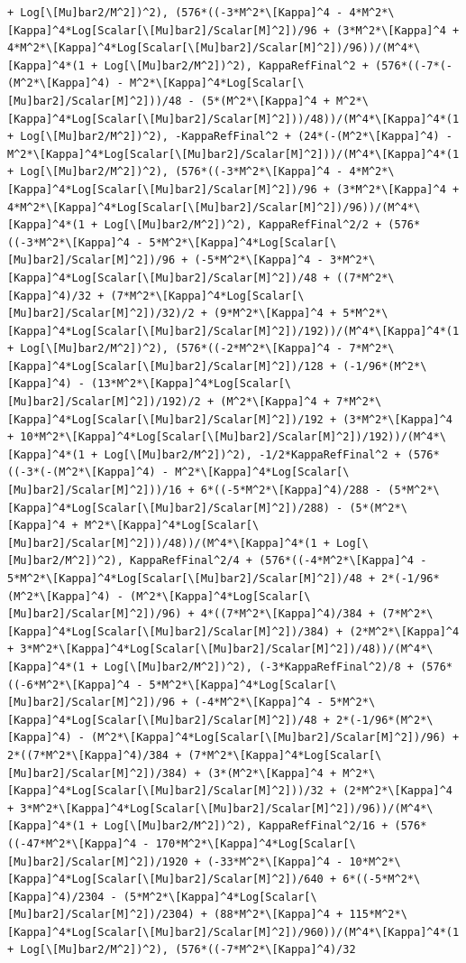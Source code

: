 \documentclass[11pt]{article}
\begin{document}
\begin{verbatim}
+ Log[\[Mu]bar2/M^2])^2), (576*((-3*M^2*\[Kappa]^4 - 4*M^2*\[Kappa]^4*Log[Scalar[\[Mu]bar2]/Scalar[M]^2])/96 + (3*M^2*\[Kappa]^4 + 4*M^2*\[Kappa]^4*Log[Scalar[\[Mu]bar2]/Scalar[M]^2])/96))/(M^4*\[Kappa]^4*(1 + Log[\[Mu]bar2/M^2])^2), KappaRefFinal^2 + (576*((-7*(-(M^2*\[Kappa]^4) - M^2*\[Kappa]^4*Log[Scalar[\[Mu]bar2]/Scalar[M]^2]))/48 - (5*(M^2*\[Kappa]^4 + M^2*\[Kappa]^4*Log[Scalar[\[Mu]bar2]/Scalar[M]^2]))/48))/(M^4*\[Kappa]^4*(1 + Log[\[Mu]bar2/M^2])^2), -KappaRefFinal^2 + (24*(-(M^2*\[Kappa]^4) - M^2*\[Kappa]^4*Log[Scalar[\[Mu]bar2]/Scalar[M]^2]))/(M^4*\[Kappa]^4*(1 + Log[\[Mu]bar2/M^2])^2), (576*((-3*M^2*\[Kappa]^4 - 4*M^2*\[Kappa]^4*Log[Scalar[\[Mu]bar2]/Scalar[M]^2])/96 + (3*M^2*\[Kappa]^4 + 4*M^2*\[Kappa]^4*Log[Scalar[\[Mu]bar2]/Scalar[M]^2])/96))/(M^4*\[Kappa]^4*(1 + Log[\[Mu]bar2/M^2])^2), KappaRefFinal^2/2 + (576*((-3*M^2*\[Kappa]^4 - 5*M^2*\[Kappa]^4*Log[Scalar[\[Mu]bar2]/Scalar[M]^2])/96 + (-5*M^2*\[Kappa]^4 - 3*M^2*\[Kappa]^4*Log[Scalar[\[Mu]bar2]/Scalar[M]^2])/48 + ((7*M^2*\[Kappa]^4)/32 + (7*M^2*\[Kappa]^4*Log[Scalar[\[Mu]bar2]/Scalar[M]^2])/32)/2 + (9*M^2*\[Kappa]^4 + 5*M^2*\[Kappa]^4*Log[Scalar[\[Mu]bar2]/Scalar[M]^2])/192))/(M^4*\[Kappa]^4*(1 + Log[\[Mu]bar2/M^2])^2), (576*((-2*M^2*\[Kappa]^4 - 7*M^2*\[Kappa]^4*Log[Scalar[\[Mu]bar2]/Scalar[M]^2])/128 + (-1/96*(M^2*\[Kappa]^4) - (13*M^2*\[Kappa]^4*Log[Scalar[\[Mu]bar2]/Scalar[M]^2])/192)/2 + (M^2*\[Kappa]^4 + 7*M^2*\[Kappa]^4*Log[Scalar[\[Mu]bar2]/Scalar[M]^2])/192 + (3*M^2*\[Kappa]^4 + 10*M^2*\[Kappa]^4*Log[Scalar[\[Mu]bar2]/Scalar[M]^2])/192))/(M^4*\[Kappa]^4*(1 + Log[\[Mu]bar2/M^2])^2), -1/2*KappaRefFinal^2 + (576*((-3*(-(M^2*\[Kappa]^4) - M^2*\[Kappa]^4*Log[Scalar[\[Mu]bar2]/Scalar[M]^2]))/16 + 6*((-5*M^2*\[Kappa]^4)/288 - (5*M^2*\[Kappa]^4*Log[Scalar[\[Mu]bar2]/Scalar[M]^2])/288) - (5*(M^2*\[Kappa]^4 + M^2*\[Kappa]^4*Log[Scalar[\[Mu]bar2]/Scalar[M]^2]))/48))/(M^4*\[Kappa]^4*(1 + Log[\[Mu]bar2/M^2])^2), KappaRefFinal^2/4 + (576*((-4*M^2*\[Kappa]^4 - 5*M^2*\[Kappa]^4*Log[Scalar[\[Mu]bar2]/Scalar[M]^2])/48 + 2*(-1/96*(M^2*\[Kappa]^4) - (M^2*\[Kappa]^4*Log[Scalar[\[Mu]bar2]/Scalar[M]^2])/96) + 4*((7*M^2*\[Kappa]^4)/384 + (7*M^2*\[Kappa]^4*Log[Scalar[\[Mu]bar2]/Scalar[M]^2])/384) + (2*M^2*\[Kappa]^4 + 3*M^2*\[Kappa]^4*Log[Scalar[\[Mu]bar2]/Scalar[M]^2])/48))/(M^4*\[Kappa]^4*(1 + Log[\[Mu]bar2/M^2])^2), (-3*KappaRefFinal^2)/8 + (576*((-6*M^2*\[Kappa]^4 - 5*M^2*\[Kappa]^4*Log[Scalar[\[Mu]bar2]/Scalar[M]^2])/96 + (-4*M^2*\[Kappa]^4 - 5*M^2*\[Kappa]^4*Log[Scalar[\[Mu]bar2]/Scalar[M]^2])/48 + 2*(-1/96*(M^2*\[Kappa]^4) - (M^2*\[Kappa]^4*Log[Scalar[\[Mu]bar2]/Scalar[M]^2])/96) + 2*((7*M^2*\[Kappa]^4)/384 + (7*M^2*\[Kappa]^4*Log[Scalar[\[Mu]bar2]/Scalar[M]^2])/384) + (3*(M^2*\[Kappa]^4 + M^2*\[Kappa]^4*Log[Scalar[\[Mu]bar2]/Scalar[M]^2]))/32 + (2*M^2*\[Kappa]^4 + 3*M^2*\[Kappa]^4*Log[Scalar[\[Mu]bar2]/Scalar[M]^2])/96))/(M^4*\[Kappa]^4*(1 + Log[\[Mu]bar2/M^2])^2), KappaRefFinal^2/16 + (576*((-47*M^2*\[Kappa]^4 - 170*M^2*\[Kappa]^4*Log[Scalar[\[Mu]bar2]/Scalar[M]^2])/1920 + (-33*M^2*\[Kappa]^4 - 10*M^2*\[Kappa]^4*Log[Scalar[\[Mu]bar2]/Scalar[M]^2])/640 + 6*((-5*M^2*\[Kappa]^4)/2304 - (5*M^2*\[Kappa]^4*Log[Scalar[\[Mu]bar2]/Scalar[M]^2])/2304) + (88*M^2*\[Kappa]^4 + 115*M^2*\[Kappa]^4*Log[Scalar[\[Mu]bar2]/Scalar[M]^2])/960))/(M^4*\[Kappa]^4*(1 + Log[\[Mu]bar2/M^2])^2), (576*((-7*M^2*\[Kappa]^4)/32 
\end{verbatim}
\end{document}
